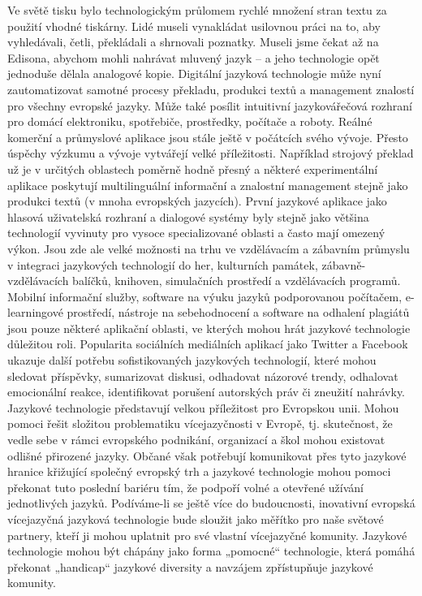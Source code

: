 \begin{multicols}{2}
Ve světě tisku bylo technologickým průlomem rychlé množení stran textu za použití vhodné tiskárny. Lidé museli vynakládat usilovnou práci na to, aby vyhledávali, četli, překládali a shrnovali poznatky. Museli jsme čekat až na Edisona, abychom mohli nahrávat mluvený jazyk – a jeho technologie opět jednoduše dělala analogové kopie.
Digitální jazyková technologie může nyní zautomatizovat samotné procesy překladu, produkci textů a management znalostí pro všechny evropské jazyky. Může také posílit intuitivní jazyková\/řečová rozhraní pro domácí elektroniku, spotřebiče, prostředky, počítače a roboty. Reálné komerční a průmyslové aplikace jsou stále ještě v počátcích svého vývoje. Přesto úspěchy výzkumu a vývoje vytvářejí velké příležitosti. Například strojový překlad už je v určitých oblastech poměrně hodně přesný a některé experimentální aplikace poskytují multilinguální informační a znalostní management stejně jako produkci textů (v mnoha evropských jazycích).
První jazykové aplikace jako hlasová uživatelská rozhraní a dialogové systémy byly stejně jako většina technologií vyvinuty pro vysoce specializované oblasti a často mají omezený výkon. Jsou zde ale velké možnosti na trhu ve vzdělávacím a zábavním průmyslu v integraci jazykových technologií do her, kulturních památek, zábavně-vzdělávacích balíčků, knihoven, simulačních prostředí a vzdělávacích programů. Mobilní informační služby, software na výuku jazyků podporovanou počítačem, e-learningové prostředí, nástroje na sebehodnocení a software na odhalení plagiátů jsou pouze některé aplikační oblasti, ve kterých mohou hrát jazykové technologie důležitou roli. Popularita sociálních mediálních aplikací jako Twitter a Facebook ukazuje další potřebu sofistikovaných jazykových technologií, které mohou sledovat příspěvky, sumarizovat diskusi, odhadovat názorové trendy, odhalovat emocionální reakce, identifikovat porušení autorských práv či zneužití nahrávky.\\
Jazykové technologie představují velkou příležitost pro Evropskou unii. Mohou pomoci řešit složitou problematiku vícejazyčnosti v Evropě, tj. skutečnost, že vedle sebe v rámci evropského podnikání, organizací a škol mohou existovat odlišné přirozené jazyky. Občané však potřebují komunikovat přes tyto jazykové hranice křižující společný evropský trh a jazykové technologie mohou pomoci překonat tuto poslední bariéru tím, že podpoří volné a otevřené užívání jednotlivých jazyků. Podíváme-li se ještě více do budoucnosti, inovativní evropská vícejazyčná jazyková technologie bude sloužit jako měřítko pro naše světové partnery, kteří ji mohou uplatnit pro své vlastní vícejazyčné komunity. Jazykové technologie mohou být chápány jako forma „pomocné“ technologie, která pomáhá překonat „handicap“ jazykové diversity a navzájem zpřístupňuje jazykové komunity.


\end{multicols}
